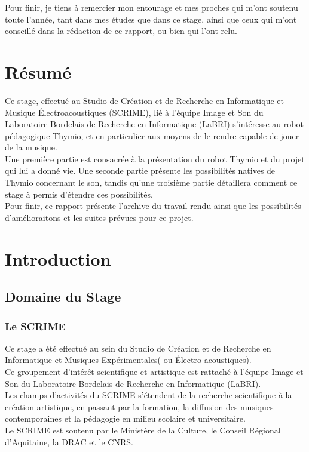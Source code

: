 \documentclass[a4paper, 12pt]{report}
\begin{document}
Pour finir, je tiens à remercier mon entourage et mes proches qui m'ont soutenu toute l'année, tant dans mes études que dans ce stage, ainsi que ceux qui m'ont conseillé dans la rédaction de ce rapport, ou bien qui l'ont relu.

\chapter*{Résumé}
	Ce stage, effectué au Studio de Création et de Recherche en Informatique et Musique Électroacoustiques (SCRIME), lié à l'équipe Image et Son du Laboratoire Bordelais de Recherche en Informatique (LaBRI) s'intéresse au robot pédagogique Thymio, et en particulier aux moyens de le rendre capable de jouer de la musique.\\
Une première partie est consacrée à la présentation du robot Thymio et du projet qui lui a donné vie. Une seconde partie présente les possibilités natives de Thymio concernant le son, tandis qu'une troisième partie détaillera comment ce stage à permis d'étendre ces possibilités.\\
Pour finir, ce rapport présente l'archive du travail rendu ainsi que les possibilités d'amélioraitons et les suites prévues pour ce projet.

\tableofcontents %

\chapter{Introduction}
\section{Domaine du Stage}
\subsection{Le SCRIME}
\label{SCRIME}
Ce stage a été effectué au sein du Studio de Création et de Recherche en Informatique et Musiques Expérimentales( ou Électro-acoustiques).\cite{SCRIME2016}\\
Ce groupement d'intérêt scientifique et artistique est rattaché à l'équipe Image et Son du Laboratoire Bordelais de Recherche en Informatique (LaBRI).\\
Les champs d'activités du SCRIME \pageref{SCRIME} s'étendent de la recherche scientifique à la création artistique, en passant par la formation, la diffusion des musiques contemporaines et la pédagogie en milieu scolaire et universitaire. \\
Le SCRIME \pageref{SCRIME} est soutenu par le Ministère de la Culture, le Conseil Régional d'Aquitaine, la DRAC et le CNRS.\\
\end{document}
